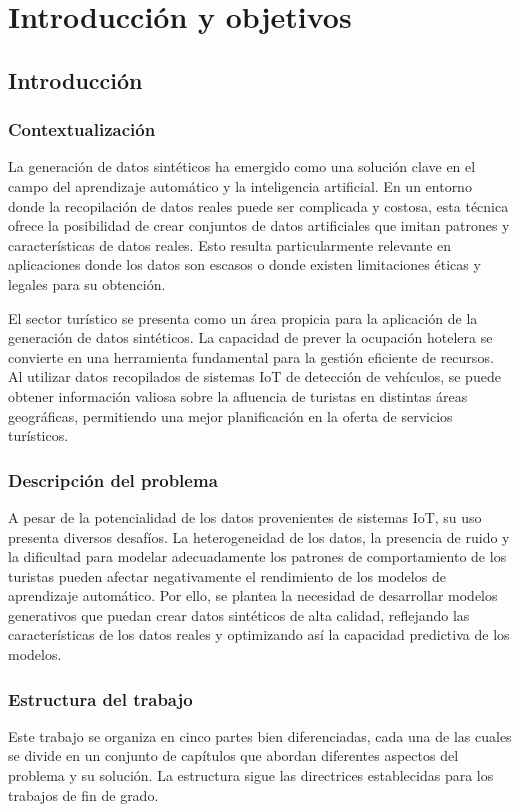 \chapter{Introducción y objetivos}

\section{Introducción}

\subsection{Contextualización}
La generación de datos sintéticos ha emergido como una solución clave en el
campo del aprendizaje automático y la inteligencia artificial. En un entorno
donde la recopilación de datos reales puede ser complicada y costosa, esta
técnica ofrece la posibilidad de crear conjuntos de datos artificiales que
imitan patrones y características de datos reales. Esto resulta particularmente
relevante en aplicaciones donde los datos son escasos o donde existen
limitaciones éticas y legales para su obtención.

El sector turístico se presenta como un área propicia para la aplicación de la
generación de datos sintéticos. La capacidad de prever la ocupación hotelera se
convierte en una herramienta fundamental para la gestión eficiente de recursos.
Al utilizar datos recopilados de sistemas IoT de detección de vehículos, se
puede obtener información valiosa sobre la afluencia de turistas en distintas
áreas geográficas, permitiendo una mejor planificación en la oferta de servicios
turísticos.

\subsection{Descripción del problema}
A pesar de la potencialidad de los datos provenientes de sistemas IoT, su uso
presenta diversos desafíos. La heterogeneidad de los datos, la presencia de
ruido y la dificultad para modelar adecuadamente los patrones de comportamiento
de los turistas pueden afectar negativamente el rendimiento de los modelos de
aprendizaje automático. Por ello, se plantea la necesidad de desarrollar modelos
generativos que puedan crear datos sintéticos de alta calidad, reflejando las
características de los datos reales y optimizando así la capacidad predictiva de
los modelos.

\subsection{Estructura del trabajo}
Este trabajo se organiza en cinco partes bien diferenciadas, cada una de las
cuales se divide en un conjunto de capítulos que abordan diferentes aspectos del
problema y su solución. La estructura sigue las directrices establecidas para
los trabajos de fin de grado.

